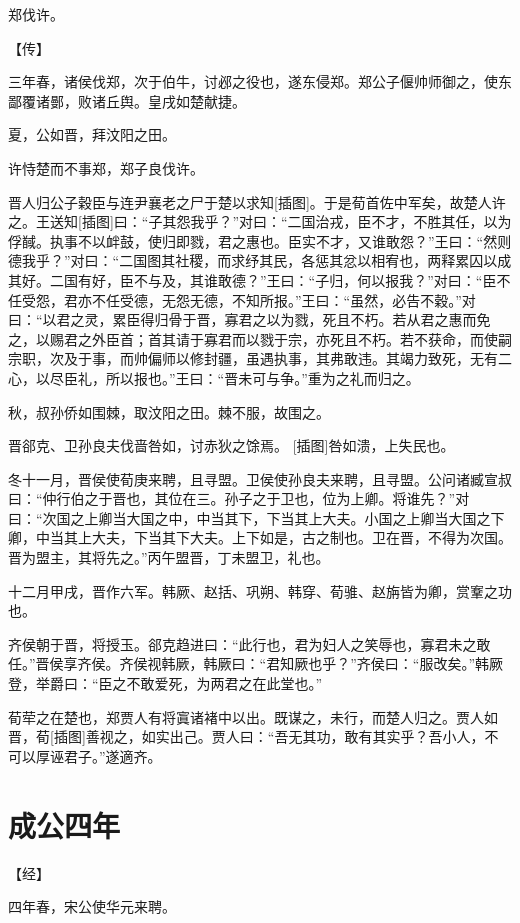 \documentclass[a4paper,12pt,UTF8,twoside]{ctexbook}
\begin{document}
郑伐许。

【传】

三年春，诸侯伐郑，次于伯牛，讨邲之役也，遂东侵郑。郑公子偃帅师御之，使东鄙覆诸鄤，败诸丘舆。皇戌如楚献捷。

夏，公如晋，拜汶阳之田。

许恃楚而不事郑，郑子良伐许。

晋人归公子穀臣与连尹襄老之尸于楚以求知[插图]。于是荀首佐中军矣，故楚人许之。王送知[插图]曰：“子其怨我乎？”对曰：“二国治戎，臣不才，不胜其任，以为俘馘。执事不以衅鼓，使归即戮，君之惠也。臣实不才，又谁敢怨？”王曰：“然则德我乎？”对曰：“二国图其社稷，而求纾其民，各惩其忿以相宥也，两释累囚以成其好。二国有好，臣不与及，其谁敢德？”王曰：“子归，何以报我？”对曰：“臣不任受怨，君亦不任受德，无怨无德，不知所报。”王曰：“虽然，必告不穀。”对曰：“以君之灵，累臣得归骨于晋，寡君之以为戮，死且不朽。若从君之惠而免之，以赐君之外臣首；首其请于寡君而以戮于宗，亦死且不朽。若不获命，而使嗣宗职，次及于事，而帅偏师以修封疆，虽遇执事，其弗敢违。其竭力致死，无有二心，以尽臣礼，所以报也。”王曰：“晋未可与争。”重为之礼而归之。

秋，叔孙侨如围棘，取汶阳之田。棘不服，故围之。

晋郤克、卫孙良夫伐啬咎如，讨赤狄之馀焉。 [插图]咎如溃，上失民也。

冬十一月，晋侯使荀庚来聘，且寻盟。卫侯使孙良夫来聘，且寻盟。公问诸臧宣叔曰：“仲行伯之于晋也，其位在三。孙子之于卫也，位为上卿。将谁先？”对曰：“次国之上卿当大国之中，中当其下，下当其上大夫。小国之上卿当大国之下卿，中当其上大夫，下当其下大夫。上下如是，古之制也。卫在晋，不得为次国。晋为盟主，其将先之。”丙午盟晋，丁未盟卫，礼也。

十二月甲戌，晋作六军。韩厥、赵括、巩朔、韩穿、荀骓、赵旃皆为卿，赏鞌之功也。

齐侯朝于晋，将授玉。郤克趋进曰：“此行也，君为妇人之笑辱也，寡君未之敢任。”晋侯享齐侯。齐侯视韩厥，韩厥曰：“君知厥也乎？”齐侯曰：“服改矣。”韩厥登，举爵曰：“臣之不敢爱死，为两君之在此堂也。”

荀荦之在楚也，郑贾人有将寘诸褚中以出。既谋之，未行，而楚人归之。贾人如晋，荀[插图]善视之，如实出己。贾人曰：“吾无其功，敢有其实乎？吾小人，不可以厚诬君子。”遂適齐。

\chapter{成公四年}



【经】

四年春，宋公使华元来聘。
\end{document}
